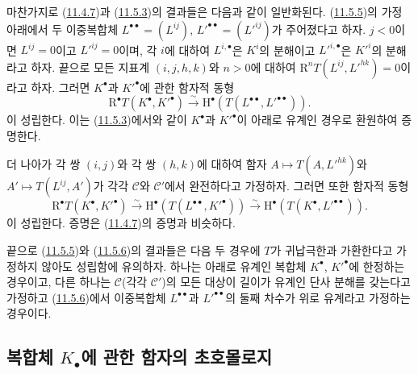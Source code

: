 \begin{env}[11.5.6]
\label{0.11.5.6-ko}
마찬가지로 (\hyperref[0.11.4.7-fr]{11.4.7})과
(\hyperref[0.11.5.3-ko]{11.5.3})의 결과들은 다음과 같이 일반화된다.
(\hyperref[0.11.5.5-ko]{11.5.5})의 가정 아래에서 두 이중복합체
$L^{\bullet\bullet}=(L^{ij})$,
$L'^{\bullet\bullet}=(L'^{ij})$가 주어졌다고 하자. $j<0$이면
$L^{ij}=0$이고 $L'^{ij}=0$이며, 각 $i$에 대하여
$L^{i,\bullet}$은 $K^i$의 분해이고 $L'^{i,\bullet}$은 $K'^i$의
분해라고 하자. 끝으로 모든 지표계 $(i,j,h,k)$와 $n>0$에 대하여
$\mathrm R^nT(L^{ij},L'^{hk})=0$이라고 하자. 그러면
$K^\bullet$과 $K'^\bullet$에 관한 함자적 동형
\[
  \label{0.11.5.6.1-ko}
  \mathrm R^\bullet T(K^\bullet,K'^\bullet)\xrightarrow{\sim}
  \mathrm H^\bullet(T(L^{\bullet\bullet},L'^{\bullet\bullet})).
  \tag{11.5.6.1}
\]
이 성립한다. 이는 (\hyperref[0.11.5.3-ko]{11.5.3})에서와 같이
$K^\bullet$과 $K'^\bullet$이 아래로 유계인 경우로 환원하여 증명한다.

더 나아가 각 쌍 $(i,j)$와 각 쌍 $(h,k)$에 대하여 함자
$A\mapsto T(A,L'^{hk})$와 $A'\mapsto T(L^{ij},A')$가 각각
$\mathcal C$와 $\mathcal C'$에서 완전하다고 가정하자. 그러면 또한
함자적 동형
\[
  \label{0.11.5.6.2-ko}
  \mathrm R^\bullet T(K^\bullet,K'^\bullet)
  \xrightarrow{\sim}\mathrm H^\bullet(T(L^{\bullet\bullet},K'^\bullet))
  \xrightarrow{\sim}\mathrm H^\bullet(T(K^\bullet,L'^{\bullet\bullet})).
  \tag{11.5.6.2}
\]
이 성립한다. 증명은 (\hyperref[0.11.4.7-fr]{11.4.7})의 증명과
비슷하다.
\end{env}

\begin{env}[11.5.7]
\label{0.11.5.7-ko}
끝으로 (\hyperref[0.11.5.5-ko]{11.5.5})와
(\hyperref[0.11.5.6-ko]{11.5.6})의 결과들은 다음 두 경우에 $T$가
귀납극한과 가환한다고 가정하지 않아도 성립함에 유의하자. 하나는
아래로 유계인 복합체 $K^\bullet$, $K'^\bullet$에 한정하는 경우이고,
다른 하나는 $\mathcal C$(각각 $\mathcal C'$)의 모든 대상이 길이가
유계인 단사 분해를 갖는다고 가정하고
(\hyperref[0.11.5.6-ko]{11.5.6})에서 이중복합체
$L^{\bullet\bullet}$과 $L'^{\bullet\bullet}$의 둘째 차수가 위로
유계라고 가정하는 경우이다.
\end{env}

\subsection{복합체 $K_\bullet$에 관한 함자의 초호몰로지}
\label{subsection:0.11.6-fr}

